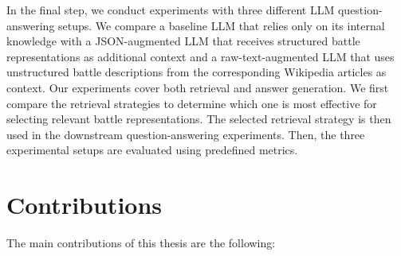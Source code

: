In the final step, we conduct experiments with three different LLM question-answering setups. We compare a baseline LLM that relies only on its internal knowledge with a JSON-augmented LLM that receives structured battle representations as additional context and a raw-text-augmented LLM that uses unstructured battle descriptions from the corresponding Wikipedia articles as context. Our experiments cover both retrieval and answer generation. We first compare the retrieval strategies to determine which one is most effective for selecting relevant battle representations. The selected retrieval strategy is then used in the downstream question-answering experiments. Then, the three experimental setups are evaluated using predefined metrics.
\section{Contributions}
\label{sec:contributions}
The main contributions of this thesis are the following:

